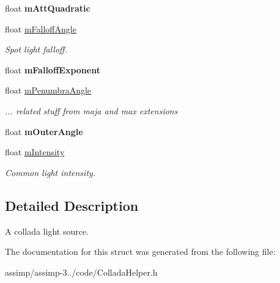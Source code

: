 \begin{DoxyCompactItemize}
\item 
\hypertarget{struct_assimp_1_1_collada_1_1_light_aac05261c38c05d824da9738745244e76}{float {\bfseries m\+Att\+Quadratic}}\label{struct_assimp_1_1_collada_1_1_light_aac05261c38c05d824da9738745244e76}

\item 
\hypertarget{struct_assimp_1_1_collada_1_1_light_a9123d02577df71c42b40a75659cc8f2c}{float \hyperlink{struct_assimp_1_1_collada_1_1_light_a9123d02577df71c42b40a75659cc8f2c}{m\+Falloff\+Angle}}\label{struct_assimp_1_1_collada_1_1_light_a9123d02577df71c42b40a75659cc8f2c}

\begin{DoxyCompactList}\small\item\em Spot light falloff. \end{DoxyCompactList}\item 
\hypertarget{struct_assimp_1_1_collada_1_1_light_ac61ca922db9539c7862fe646f067a717}{float {\bfseries m\+Falloff\+Exponent}}\label{struct_assimp_1_1_collada_1_1_light_ac61ca922db9539c7862fe646f067a717}

\item 
\hypertarget{struct_assimp_1_1_collada_1_1_light_ab13df8ea43ff9f6ee7f2b5b8db96348e}{float \hyperlink{struct_assimp_1_1_collada_1_1_light_ab13df8ea43ff9f6ee7f2b5b8db96348e}{m\+Penumbra\+Angle}}\label{struct_assimp_1_1_collada_1_1_light_ab13df8ea43ff9f6ee7f2b5b8db96348e}

\begin{DoxyCompactList}\small\item\em ... related stuff from maja and max extensions \end{DoxyCompactList}\item 
\hypertarget{struct_assimp_1_1_collada_1_1_light_a4c936b6697aa91d2a3579b3ce704a03d}{float {\bfseries m\+Outer\+Angle}}\label{struct_assimp_1_1_collada_1_1_light_a4c936b6697aa91d2a3579b3ce704a03d}

\item 
\hypertarget{struct_assimp_1_1_collada_1_1_light_ae83148404f2a0d116137737b62085025}{float \hyperlink{struct_assimp_1_1_collada_1_1_light_ae83148404f2a0d116137737b62085025}{m\+Intensity}}\label{struct_assimp_1_1_collada_1_1_light_ae83148404f2a0d116137737b62085025}

\begin{DoxyCompactList}\small\item\em Common light intensity. \end{DoxyCompactList}\end{DoxyCompactItemize}


\subsection{Detailed Description}
A collada light source. 

The documentation for this struct was generated from the following file\+:\begin{DoxyCompactItemize}
\item 
assimp/assimp-\/3../code/Collada\+Helper.\+h\end{DoxyCompactItemize}
